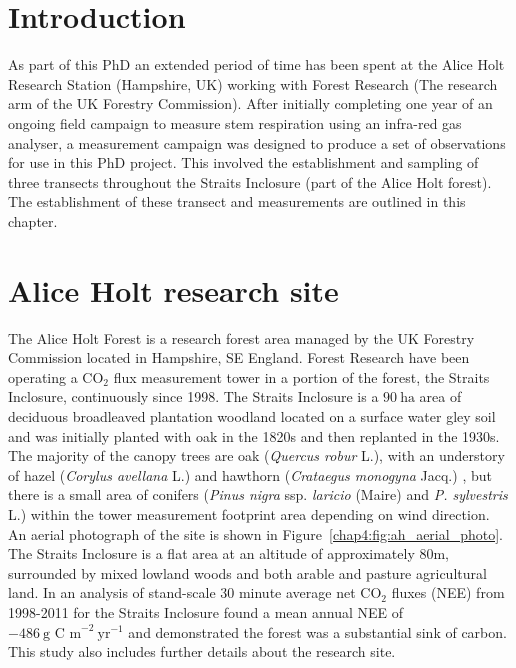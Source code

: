 
\section{Introduction}

As part of this PhD an extended period of time has been spent at the Alice Holt Research Station (Hampshire, UK) working with Forest Research (The research arm of the UK Forestry Commission). After initially completing one year of an ongoing field campaign to measure stem respiration using an infra-red gas analyser, a measurement campaign was designed to produce a set of observations for use in this PhD project. This involved the establishment and sampling of three transects throughout the Straits Inclosure (part of the Alice Holt forest). The establishment of these transect and measurements are outlined in this chapter.


\section{Alice Holt research site}

The Alice Holt Forest is a research forest area managed by the UK Forestry Commission located in Hampshire, SE England. Forest Research have been operating a $\text{CO}_{2}$ flux measurement tower in a portion of the forest, the Straits Inclosure, continuously since 1998. The Straits Inclosure is a $90~\text{ha}$ area of deciduous broadleaved plantation woodland located on a surface water gley soil and was initially planted with oak in the 1820s \citep{schlich1905working} and then replanted in the 1930s. The majority of the canopy trees are oak (\textit{Quercus robur} L.), with an understory of hazel (\textit{Corylus avellana} L.) and hawthorn (\textit{Crataegus monogyna} Jacq.) \citep{pitman2001leaf}, but there is a small area of conifers (\textit{Pinus nigra} ssp. \textit{laricio} (Maire) and \textit{P. sylvestris} L.) within the tower measurement footprint area depending on wind direction. An aerial photograph of the site is shown in Figure~\ref{chap4:fig:ah_aerial_photo}. The Straits Inclosure is a flat area at an altitude of approximately 80m, surrounded by mixed lowland woods and both arable and pasture agricultural land. In \citet{wilkinson2012inter} an analysis of stand-scale $30$ minute average net $\text{CO}_{2}$ fluxes (NEE) from 1998-2011 for the Straits Inclosure found a mean annual NEE of \(-486~\text{g C m}^{-2}~\text{yr}^{-1}\) and demonstrated the forest was a substantial sink of carbon. This study also includes further details about the research site. 


